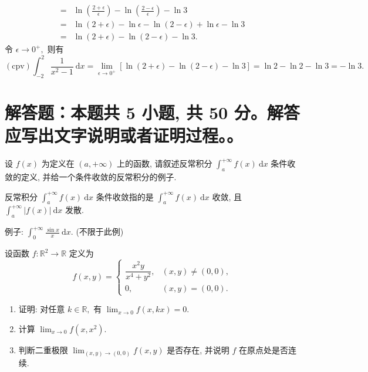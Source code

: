 \begin{solution}
\begin{align*}
= & \ln \left( \frac{2+\epsilon}{\epsilon} \right) - \ln \left( \frac{2-\epsilon}{\epsilon} \right) - \ln 3 \\
= & \ln(2+\epsilon) - \ln \epsilon - \ln(2-\epsilon) + \ln \epsilon - \ln 3 \\
= & \ln(2+\epsilon) - \ln(2-\epsilon) - \ln 3.
\end{align*}
令 $\epsilon \to 0^+,$ 则有
\begin{equation*}
(\text{cpv}) \int_{-2}^2 \frac{1}{x^2 - 1} ~ \mathrm{d}x = \lim_{\epsilon \to 0^+} [\ln(2+\epsilon) - \ln(2-\epsilon) - \ln 3] = \ln 2 - \ln 2 - \ln 3 = -\ln 3.
\end{equation*}
\end{solution}


\section{解答题：本题共 5 小题, 共 50 分。解答应写出文字说明或者证明过程。。}


\begin{question}[points = 8]
设 $f(x)$ 为定义在 $(a, +\infty)$ 上的函数, 请叙述反常积分 $\int_a^{+\infty} f(x) ~ \mathrm{d}x$ 条件收敛的定义, 并给一个条件收敛的反常积分的例子.

\end{question}

\begin{solution}
反常积分 $\int_a^{+\infty} f(x) ~ \mathrm{d}x$ 条件收敛指的是 $\int_a^{+\infty} f(x) ~ \mathrm{d}x$ 收敛, 且  $\int_a^{+\infty} |f(x)| ~ \mathrm{d}x$ 发散. 

例子: $\int_0^{+\infty} \frac{\sin x}{x} ~ \mathrm{d} x.$ (不限于此例) 
\end{solution}


\begin{question}[points = 10]
设函数 $f: \mathbb{R}^2 \to \mathbb{R}$ 定义为
\[
f(x, y) = \begin{cases} \dfrac{x^2 y}{x^4 + y^2}, & (x, y) \neq (0, 0), \\ 0, & (x, y) = (0, 0). \end{cases}
\]
\begin{enumerate}
\item 证明: 对任意 $k \in \mathbb{R},$ 有 $\displaystyle\lim_{x \to 0} f(x, kx) = 0.$
\item 计算 $\displaystyle\lim_{x \to 0} f(x, x^2).$
\item 判断二重极限 $\displaystyle\lim_{(x,y) \to (0,0)} f(x,y)$ 是否存在, 并说明 $f$ 在原点处是否连续.
\end{enumerate}

\end{question}

